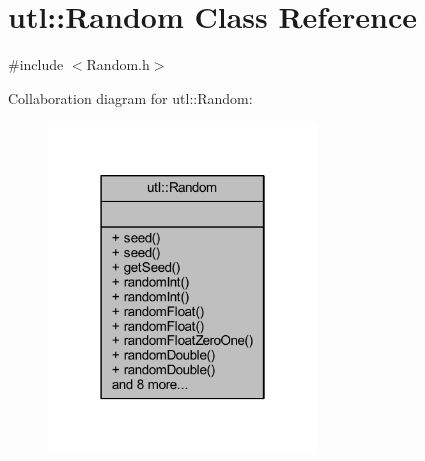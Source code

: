 \hypertarget{classutl_1_1_random}{}\section{utl\+:\+:Random Class Reference}
\label{classutl_1_1_random}


{\ttfamily \#include $<$Random.\+h$>$}



Collaboration diagram for utl\+:\+:Random\+:\nopagebreak
\begin{figure}[H]
\begin{center}
\leavevmode
\includegraphics[width=202pt]{classutl_1_1_random__coll__graph}
\end{center}
\end{figure}

